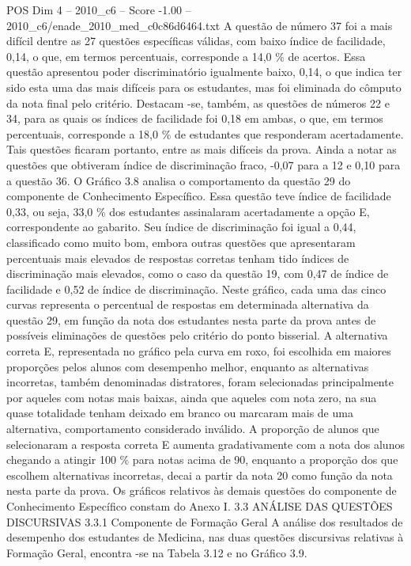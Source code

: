 \begin{textsample}{POS Dim 4 – 2010\_c6 – Score -1.00 – 2010\_c6/enade\_2010\_med\_c0c86d6464.txt}
A questão de número 37 foi a mais difícil dentre as 27 questões específicas válidas, com baixo índice de facilidade, 0,14, o que, em termos percentuais, corresponde a 14,0 \% de acertos.
Essa questão apresentou poder discriminatório igualmente baixo, 0,14, o que indica ter sido esta uma das mais difíceis para os estudantes, mas foi eliminada do cômputo da nota final pelo critério.
Destacam -se, também, as questões de números 22 e 34, para as quais os índices de facilidade foi 0,18 em ambas, o que, em termos percentuais, corresponde a 18,0 \% de estudantes que responderam acertadamente.
Tais questões ficaram portanto, entre as mais difíceis da prova.
Ainda a notar as questões que obtiveram índice de discriminação fraco, -0,07 para a 12 e 0,10 para a questão 36.
O Gráfico 3.8 analisa o comportamento da questão 29 do componente de Conhecimento Específico.
Essa questão teve índice de facilidade 0,33, ou seja, 33,0 \% dos estudantes assinalaram acertadamente a opção E, correspondente ao gabarito.
Seu índice de discriminação foi igual a 0,44, classificado como muito bom, embora outras questões que apresentaram percentuais mais elevados de respostas corretas tenham tido índices de discriminação mais elevados, como o caso da questão 19, com 0,47 de índice de facilidade e 0,52 de índice de discriminação.
Neste gráfico, cada uma das cinco curvas representa o percentual de respostas em determinada alternativa da questão 29, em função da nota dos estudantes nesta parte da prova antes de possíveis eliminações de questões pelo critério do ponto bisserial.
A alternativa correta E, representada no gráfico pela curva em roxo, foi escolhida em maiores proporções pelos alunos com desempenho melhor, enquanto as alternativas incorretas, também denominadas distratores, foram selecionadas principalmente por aqueles com notas mais baixas, ainda que aqueles com nota zero, na sua quase totalidade tenham deixado em branco ou marcaram mais de uma alternativa, comportamento considerado inválido.
A proporção de alunos que selecionaram a resposta correta E aumenta gradativamente com a nota dos alunos chegando a atingir 100 \% para notas acima de 90, enquanto a proporção dos que escolhem alternativas incorretas, decai a partir da nota 20 como função da nota nesta parte da prova.
Os gráficos relativos às demais questões do componente de Conhecimento Específico constam do Anexo I. 3.3 ANÁLISE DAS QUESTÕES DISCURSIVAS 3.3.1 Componente de Formação Geral A análise dos resultados de desempenho dos estudantes de Medicina, nas duas questões discursivas relativas à Formação Geral, encontra -se na Tabela 3.12 e no Gráfico 3.9.

\end{textsample}
